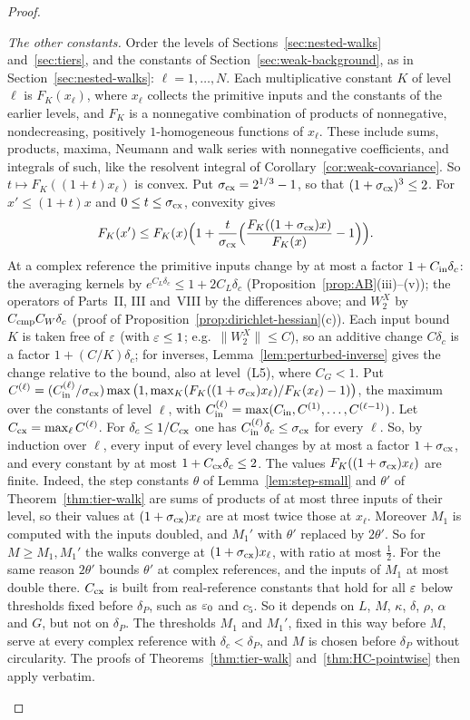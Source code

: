 \begin{proof}
\begin{enumerate}[label=(\roman*)]
  \emph{The other constants.} Order the levels of Sections~\ref{sec:nested-walks} and~\ref{sec:tiers}, and the constants of Section~\ref{sec:weak-background}, as in Section~\ref{sec:nested-walks}: $\ell=1,\dots,N$. Each multiplicative constant $K$ of level $\ell$ is $F_K(x_\ell)$, where $x_\ell$ collects the primitive inputs and the constants of the earlier levels, and $F_K$ is a nonnegative combination of products of nonnegative, nondecreasing, positively $1$-homogeneous functions of $x_\ell$. These include sums, products, maxima, Neumann and walk series with nonnegative coefficients, and integrals of such, like the resolvent integral of Corollary~\ref{cor:weak-covariance}. So $t\mapsto F_K((1+t)x_\ell)$ is convex. Put $\sigma_{\rm cx}=2^{1/3}-1$, so that $(1+\sigma_{\rm cx})^3\le2$. For $x'\le(1+t)x$ and $0\le t\le\sigma_{\rm cx}$, convexity gives
  \[
  F_K(x')\le F_K(x)\Big(1+\frac t{\sigma_{\rm cx}}\Big(\frac{F_K((1+\sigma_{\rm cx})x)}{F_K(x)}-1\Big)\Big).
  \]
  At a complex reference the primitive inputs change by at most a factor $1+C_{\rm in}\delta_c$: the averaging kernels by $e^{C_L\delta_c}\le1+2C_L\delta_c$ (Proposition~\ref{prop:AB}(iii)--(v)); the operators of Parts~II, III and~VIII by the differences above; and $W_2^X$ by $C_{\rm cmp}C_W\delta_c$ (proof of Proposition~\ref{prop:dirichlet-hessian}(c)). Each input bound $K$ is taken free of $\varepsilon$ (with $\varepsilon\le1$; e.g.\ $\|W_2^X\|\le C$), so an additive change $C\delta_c$ is a factor $1+(C/K)\delta_c$; for inverses, Lemma~\ref{lem:perturbed-inverse} gives the change relative to the bound, also at level~(L5), where $C_G<1$. Put $C^{(\ell)}=(C^{(\ell)}_{\rm in}/\sigma_{\rm cx})\max\big(1,\max_K(F_K((1+\sigma_{\rm cx})x_\ell)/F_K(x_\ell)-1)\big)$, the maximum over the constants of level $\ell$, with $C^{(\ell)}_{\rm in}=\max(C_{\rm in},C^{(1)},\dots,C^{(\ell-1)})$. Let $C_{\rm cx}=\max_\ell C^{(\ell)}$. For $\delta_c\le1/C_{\rm cx}$ one has $C^{(\ell)}_{\rm in}\delta_c\le\sigma_{\rm cx}$ for every $\ell$. So, by induction over $\ell$, every input of every level changes by at most a factor $1+\sigma_{\rm cx}$, and every constant by at most $1+C_{\rm cx}\delta_c\le2$. The values $F_K((1+\sigma_{\rm cx})x_\ell)$ are finite. Indeed, the step constants $\theta$ of Lemma~\ref{lem:step-small} and $\theta'$ of Theorem~\ref{thm:tier-walk} are sums of products of at most three inputs of their level, so their values at $(1+\sigma_{\rm cx})x_\ell$ are at most twice those at $x_\ell$. Moreover $M_1$ is computed with the inputs doubled, and $M_1'$ with $\theta'$ replaced by $2\theta'$. So for $M\ge M_1,M_1'$ the walks converge at $(1+\sigma_{\rm cx})x_\ell$, with ratio at most $\frac12$. For the same reason $2\theta'$ bounds $\theta'$ at complex references, and the inputs of $M_1$ at most double there. $C_{\rm cx}$ is built from real-reference constants that hold for all $\varepsilon$ below thresholds fixed before $\delta_P$, such as $\varepsilon_0$ and $c_5$. So it depends on $L$, $M$, $\kappa$, $\delta$, $\rho$, $\alpha$ and $G$, but not on $\delta_P$. The thresholds $M_1$ and $M_1'$, fixed in this way before $M$, serve at every complex reference with $\delta_c<\delta_P$, and $M$ is chosen before $\delta_P$ without circularity. The proofs of Theorems~\ref{thm:tier-walk} and~\ref{thm:HC-pointwise} then apply verbatim.

\end{enumerate}
\end{proof}
